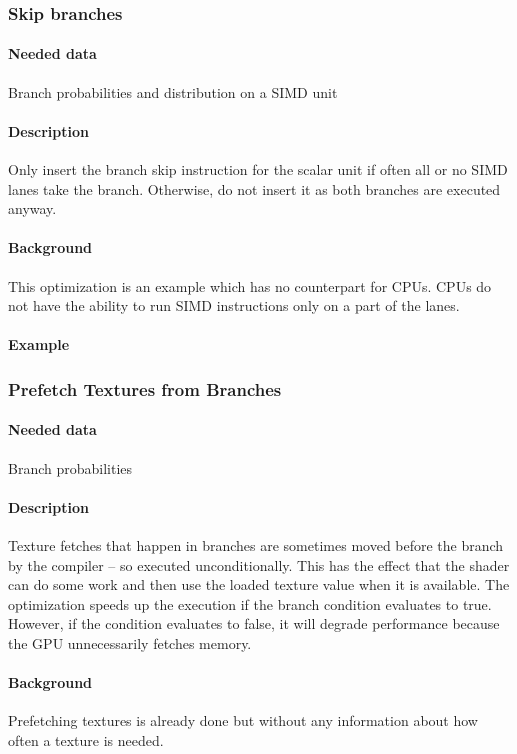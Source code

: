 \subsubsection{Skip branches}
\paragraph{Needed data} Branch probabilities and distribution on a SIMD unit
\paragraph{Description} Only insert the branch skip instruction for the scalar unit if often all or no SIMD lanes take the branch. Otherwise, do not insert it as both branches are executed anyway.
\paragraph{Background} This optimization is an example which has no counterpart for CPUs. CPUs do not have the ability to run SIMD instructions only on a part of the lanes.
\paragraph{Example}
	
\subsubsection{Prefetch Textures from Branches}
\paragraph{Needed data} Branch probabilities
\paragraph{Description} Texture fetches that happen in branches are sometimes moved before the branch by the compiler -- so executed unconditionally. This has the effect that the shader can do some work and then use the loaded texture value when it is available. The optimization speeds up the execution if the branch condition evaluates to true. However, if the condition evaluates to false, it will degrade performance because the GPU unnecessarily fetches memory.
\paragraph{Background} Prefetching textures is already done but without any information about how often a texture is needed.

